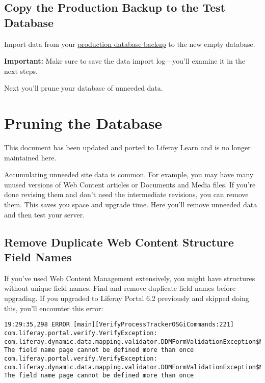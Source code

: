 \section{Copy the Production Backup to the Test
Database}\label{copy-the-production-backup-to-the-test-database}

Import data from your
\href{/docs/7-2/deploy/-/knowledge_base/d/backing-up-a-liferay-installation}{production
database backup} to the new empty database.

\noindent\hrulefill

\textbf{Important:} Make sure to save the data import log---you'll
examine it in the next steps.

\noindent\hrulefill

Next you'll prune your database of unneeded data.

\chapter{Pruning the Database}\label{pruning-the-database}

{This document has been updated and ported to Liferay Learn and is no
longer maintained here.}

Accumulating unneeded site data is common. For example, you may have
many unused versions of Web Content articles or Documents and Media
files. If you're done revising them and don't need the intermediate
revisions, you can remove them. This saves you space and upgrade time.
Here you'll remove unneeded data and then test your server.

\section{Remove Duplicate Web Content Structure Field
Names}\label{remove-duplicate-web-content-structure-field-names}

If you've used Web Content Management extensively, you might have
structures without unique field names. Find and remove duplicate field
names before upgrading. If you upgraded to Liferay Portal 6.2 previously
and skipped doing this, you'll encounter this error:

\begin{verbatim}
19:29:35,298 ERROR [main][VerifyProcessTrackerOSGiCommands:221] com.liferay.portal.verify.VerifyException: com.liferay.dynamic.data.mapping.validator.DDMFormValidationException$MustNotDuplicateFieldName: The field name page cannot be defined more than once
com.liferay.portal.verify.VerifyException: com.liferay.dynamic.data.mapping.validator.DDMFormValidationException$MustNotDuplicateFieldName: The field name page cannot be defined more than once
\end{verbatim}


